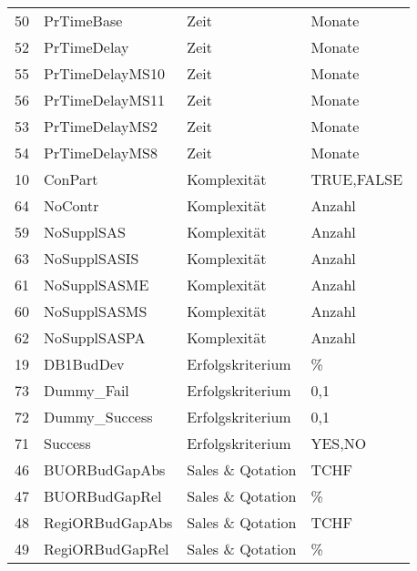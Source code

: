 \begin{longtable}[ht]{p{} p{} p{} p{}}
	50    & PrTimeBase & Zeit  & Monate \\
	52    & PrTimeDelay & Zeit  & Monate \\
	55    & PrTimeDelayMS10 & Zeit  & Monate \\
	56    & PrTimeDelayMS11 & Zeit  & Monate \\
	53    & PrTimeDelayMS2 & Zeit  & Monate \\
	54    & PrTimeDelayMS8 & Zeit  & Monate \\
	10    & ConPart & Komplexität & {TRUE,FALSE} \\
	64    & NoContr & Komplexität & Anzahl \\
	59    & NoSupplSAS & Komplexität & Anzahl \\
	63    & NoSupplSASIS & Komplexität & Anzahl \\
	61    & NoSupplSASME & Komplexität & Anzahl \\
	60    & NoSupplSASMS & Komplexität & Anzahl \\
	62    & NoSupplSASPA & Komplexität & Anzahl \\
	19    & DB1BudDev & Erfolgskriterium & \% \\
	73    & Dummy\_Fail & Erfolgskriterium & {0,1} \\
	72    & Dummy\_Success & Erfolgskriterium & {0,1} \\
	71    & Success & Erfolgskriterium & {YES,NO} \\
	46    & BUORBudGapAbs & Sales \& Qotation & TCHF \\
	47    & BUORBudGapRel & Sales \& Qotation & \% \\
	48    & RegiORBudGapAbs & Sales \& Qotation & TCHF \\
	49    & RegiORBudGapRel & Sales \& Qotation & \% \\
\end{longtable}
